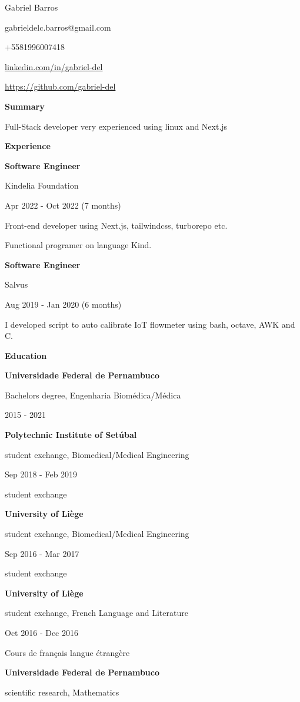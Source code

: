 Gabriel Barros

gabrieldelc.barros@gmail.com

+5581996007418

\href{https://www.linkedin.com/in/gabriel-del}{linkedin.com/in/gabriel-del}

\url{https://github.com/gabriel-del}

\textbf{Summary}

Full-Stack developer very experienced using linux and Next.js

\textbf{Experience}

\textbf{Software Engineer}

Kindelia Foundation

Apr 2022 - Oct 2022 (7 months)

Front-end developer using Next.js, tailwindcss, turborepo etc.

Functional programer on language Kind.

\textbf{Software Engineer}

Salvus

Aug 2019 - Jan 2020 (6 months)

I developed script to auto calibrate IoT flowmeter using bash, octave,
AWK and C.

\textbf{Education}

\textbf{Universidade Federal de Pernambuco}

Bachelor\textquotesingle s degree, Engenharia Biomédica/Médica

2015 - 2021

\textbf{Polytechnic Institute of Setúbal}

student exchange, Biomedical/Medical Engineering

Sep 2018 - Feb 2019

student exchange

\textbf{University of Liège}

student exchange, Biomedical/Medical Engineering

Sep 2016 - Mar 2017

student exchange

\textbf{University of Liège}

student exchange, French Language and Literature

Oct 2016 - Dec 2016

Cours de français langue étrangère

\textbf{Universidade Federal de Pernambuco}

scientific research, Mathematics

